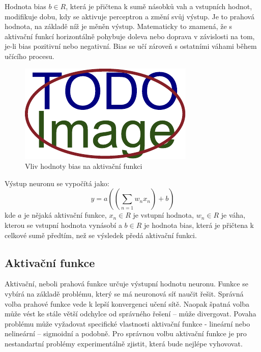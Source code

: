 Hodnota bias $b \in R$, která je přičtena k sumě násobků vah a vstupních hodnot, modifikuje dobu, kdy se aktivuje perceptron a změní svůj výstup. Je to prahová hodnota, na základě níž je měněn výstup. Matematicky to znamená, že s aktivační funkcí horizontálně pohybuje doleva nebo doprava v závislosti na tom, je-li bias pozitivní nebo negativní. Bias se učí zároveň s ostatními váhami během učícího procesu.

\begin{figure}[H]
    \centering
    \includegraphics[scale=1]{obrazky-figures/placeholder.pdf}
    \caption{\label{fig:bias}Vliv hodnoty bias na aktivační funkci}
\end{figure}

Výstup neuronu se vypočítá jako:
\begin{equation}
y = a((\sum_{n=1} w_nx_n) + b)
\end{equation}
kde $a$ je nějaká aktivační funkce, $x_n \in R$ je vstupní hodnota, $w_n \in R$ je váha, kterou se vstupní hodnota vynásobí a $b \in R$ je hodnota bias, která je přičtena k celkové sumě předtím, než se výsledek předá aktivační funkci.


\subsection{Aktivační funkce}
Aktivační, neboli prahová funkce určuje výstupní hodnotu neuronu. Funkce se vybírá na základě problému, který se má neuronová síť naučit řešit. Správná volba prahové funkce vede k lepší konvergenci učení sítě. Naopak špatná volba může vést ke stále větší odchylce od správného řešení -- může divergovat. Povaha problému může vyžadovat specifické vlastnosti aktivační funkce - lineární nebo nelineární -- sigmoidní a podobně. Pro správnou volbu aktivační funkce je pro nestandartní problémy experimentálně zjistit, která bude nejlépe vyhovovat.

